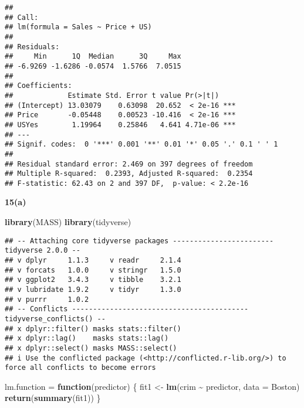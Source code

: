 \documentclass[
]{article}
\newenvironment{Shaded}{\begin{snugshade}}{\end{snugshade}}
\newcommand{\AttributeTok}[1]{\textcolor[rgb]{0.13,0.29,0.53}{#1}}
\newcommand{\ControlFlowTok}[1]{\textcolor[rgb]{0.13,0.29,0.53}{\textbf{#1}}}
\newcommand{\FunctionTok}[1]{\textcolor[rgb]{0.13,0.29,0.53}{\textbf{#1}}}
\newcommand{\NormalTok}[1]{#1}
\newcommand{\OtherTok}[1]{\textcolor[rgb]{0.56,0.35,0.01}{#1}}
\newcommand{\SpecialCharTok}[1]{\textcolor[rgb]{0.81,0.36,0.00}{\textbf{#1}}}
\begin{document}
\begin{verbatim}
## 
## Call:
## lm(formula = Sales ~ Price + US)
## 
## Residuals:
##     Min      1Q  Median      3Q     Max 
## -6.9269 -1.6286 -0.0574  1.5766  7.0515 
## 
## Coefficients:
##             Estimate Std. Error t value Pr(>|t|)    
## (Intercept) 13.03079    0.63098  20.652  < 2e-16 ***
## Price       -0.05448    0.00523 -10.416  < 2e-16 ***
## USYes        1.19964    0.25846   4.641 4.71e-06 ***
## ---
## Signif. codes:  0 '***' 0.001 '**' 0.01 '*' 0.05 '.' 0.1 ' ' 1
## 
## Residual standard error: 2.469 on 397 degrees of freedom
## Multiple R-squared:  0.2393, Adjusted R-squared:  0.2354 
## F-statistic: 62.43 on 2 and 397 DF,  p-value: < 2.2e-16
\end{verbatim}

\textbf{15(a)}

\begin{Shaded}
\begin{Highlighting}[]
\FunctionTok{library}\NormalTok{(MASS) }
\FunctionTok{library}\NormalTok{(tidyverse)}
\end{Highlighting}
\end{Shaded}

\begin{verbatim}
## -- Attaching core tidyverse packages ------------------------ tidyverse 2.0.0 --
## v dplyr     1.1.3     v readr     2.1.4
## v forcats   1.0.0     v stringr   1.5.0
## v ggplot2   3.4.3     v tibble    3.2.1
## v lubridate 1.9.2     v tidyr     1.3.0
## v purrr     1.0.2     
## -- Conflicts ------------------------------------------ tidyverse_conflicts() --
## x dplyr::filter() masks stats::filter()
## x dplyr::lag()    masks stats::lag()
## x dplyr::select() masks MASS::select()
## i Use the conflicted package (<http://conflicted.r-lib.org/>) to force all conflicts to become errors
\end{verbatim}

\begin{Shaded}
\begin{Highlighting}[]
\NormalTok{lm.function }\OtherTok{=} \ControlFlowTok{function}\NormalTok{(predictor) \{}
\NormalTok{  fit1 }\OtherTok{\textless{}{-}} \FunctionTok{lm}\NormalTok{(crim }\SpecialCharTok{\textasciitilde{}}\NormalTok{ predictor, }\AttributeTok{data =}\NormalTok{ Boston)}
  \FunctionTok{return}\NormalTok{(}\FunctionTok{summary}\NormalTok{(fit1))}
\NormalTok{\}}
\end{Highlighting}
\end{Shaded}
\end{document}
